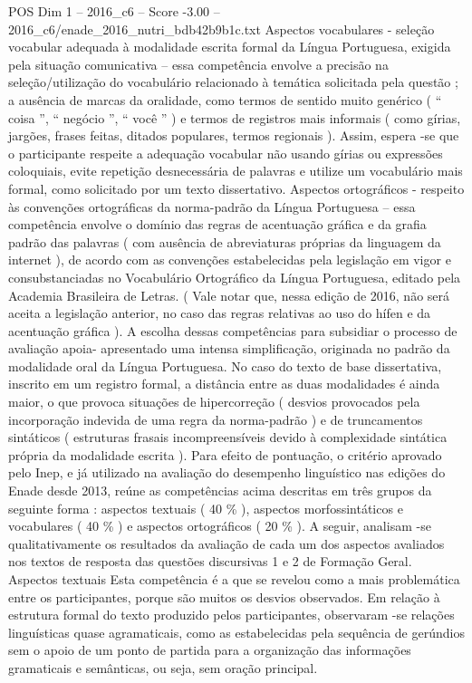 \begin{textsample}{POS Dim 1 – 2016\_c6 – Score -3.00 – 2016\_c6/enade\_2016\_nutri\_bdb42b9b1c.txt}
Aspectos vocabulares - seleção vocabular adequada à modalidade escrita formal da Língua Portuguesa, exigida pela situação comunicativa – essa competência envolve a precisão na seleção/utilização do vocabulário relacionado à temática solicitada pela questão ; a ausência de marcas da oralidade, como termos de sentido muito genérico ( “ coisa ”, “ negócio ”, “ você ” ) e termos de registros mais informais ( como gírias, jargões, frases feitas, ditados populares, termos regionais ).
Assim, espera -se que o participante respeite a adequação vocabular não usando gírias ou expressões coloquiais, evite repetição desnecessária de palavras e utilize um vocabulário mais formal, como solicitado por um texto dissertativo.
Aspectos ortográficos - respeito às convenções ortográficas da norma-padrão da Língua Portuguesa – essa competência envolve o domínio das regras de acentuação gráfica e da grafia padrão das palavras ( com ausência de abreviaturas próprias da linguagem da internet ), de acordo com as convenções estabelecidas pela legislação em vigor e consubstanciadas no Vocabulário Ortográfico da Língua Portuguesa, editado pela Academia Brasileira de Letras. ( Vale notar que, nessa edição de 2016, não será aceita a legislação anterior, no caso das regras relativas ao uso do hífen e da acentuação gráfica ).
A escolha dessas competências para subsidiar o processo de avaliação apoia- apresentado uma intensa simplificação, originada no padrão da modalidade oral da Língua Portuguesa.
No caso do texto de base dissertativa, inscrito em um registro formal, a distância entre as duas modalidades é ainda maior, o que provoca situações de hipercorreção ( desvios provocados pela incorporação indevida de uma regra da norma-padrão ) e de truncamentos sintáticos ( estruturas frasais incompreensíveis devido à complexidade sintática própria da modalidade escrita ).
Para efeito de pontuação, o critério aprovado pelo Inep, e já utilizado na avaliação do desempenho linguístico nas edições do Enade desde 2013, reúne as competências acima descritas em três grupos da seguinte forma : aspectos textuais ( 40 \% ), aspectos morfossintáticos e vocabulares ( 40 \% ) e aspectos ortográficos ( 20 \% ).
A seguir, analisam -se qualitativamente os resultados da avaliação de cada um dos aspectos avaliados nos textos de resposta das questões discursivas 1 e 2 de Formação Geral.
Aspectos textuais Esta competência é a que se revelou como a mais problemática entre os participantes, porque são muitos os desvios observados.
Em relação à estrutura formal do texto produzido pelos participantes, observaram -se relações linguísticas quase agramaticais, como as estabelecidas pela sequência de gerúndios sem o apoio de um ponto de partida para a organização das informações gramaticais e semânticas, ou seja, sem oração principal.

\end{textsample}

